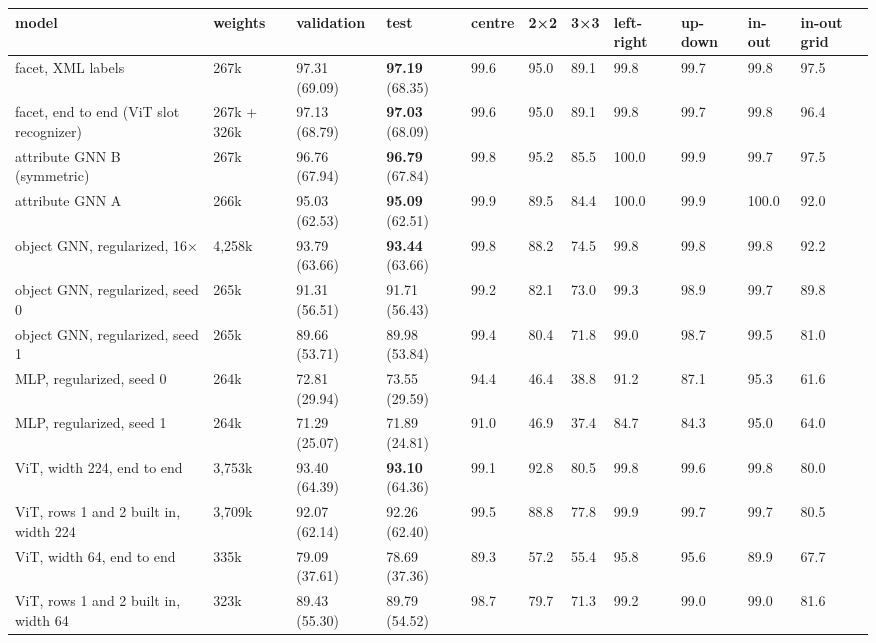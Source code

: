 \begin{center}\small
\begin{tabularx}{\linewidth}{@{}Yllllllllll@{}}
\toprule
model & weights & validation & \textbf{test} & centre & 2×2 & 3×3 & left-right & up-down & in-out & in-out grid \\
\midrule
facet, XML labels & 267k & 97.31 (69.09) & \textbf{97.19} (68.35) & 99.6 & 95.0 & 89.1 & 99.8 & 99.7 & 99.8 & 97.5 \\
facet, end to end (ViT slot recognizer) & 267k + 326k & 97.13 (68.79) & \textbf{97.03} (68.09) & 99.6 & 95.0 & 89.1 & 99.8 & 99.7 & 99.8 & 96.4 \\
attribute GNN B (symmetric) & 267k & 96.76 (67.94) & \textbf{96.79} (67.84) & 99.8 & 95.2 & 85.5 & 100.0 & 99.9 & 99.7 & 97.5 \\
attribute GNN A & 266k & 95.03 (62.53) & \textbf{95.09} (62.51) & 99.9 & 89.5 & 84.4 & 100.0 & 99.9 & 100.0 & 92.0 \\
object GNN, regularized, 16× & 4,258k & 93.79 (63.66) & \textbf{93.44} (63.66) & 99.8 & 88.2 & 74.5 & 99.8 & 99.8 & 99.8 & 92.2 \\
object GNN, regularized, seed 0 & 265k & 91.31 (56.51) & 91.71 (56.43) & 99.2 & 82.1 & 73.0 & 99.3 & 98.9 & 99.7 & 89.8 \\
object GNN, regularized, seed 1 & 265k & 89.66 (53.71) & 89.98 (53.84) & 99.4 & 80.4 & 71.8 & 99.0 & 98.7 & 99.5 & 81.0 \\
MLP, regularized, seed 0 & 264k & 72.81 (29.94) & 73.55 (29.59) & 94.4 & 46.4 & 38.8 & 91.2 & 87.1 & 95.3 & 61.6 \\
MLP, regularized, seed 1 & 264k & 71.29 (25.07) & 71.89 (24.81) & 91.0 & 46.9 & 37.4 & 84.7 & 84.3 & 95.0 & 64.0 \\
ViT, width 224, end to end & 3,753k & 93.40 (64.39) & \textbf{93.10} (64.36) & 99.1 & 92.8 & 80.5 & 99.8 & 99.6 & 99.8 & 80.0 \\
ViT, rows 1 and 2 built in, width 224 & 3,709k & 92.07 (62.14) & 92.26 (62.40) & 99.5 & 88.8 & 77.8 & 99.9 & 99.7 & 99.7 & 80.5 \\
ViT, width 64, end to end & 335k & 79.09 (37.61) & 78.69 (37.36) & 89.3 & 57.2 & 55.4 & 95.8 & 95.6 & 89.9 & 67.7 \\
ViT, rows 1 and 2 built in, width 64 & 323k & 89.43 (55.30) & 89.79 (54.52) & 98.7 & 79.7 & 71.3 & 99.2 & 99.0 & 99.0 & 81.6 \\
\bottomrule
\end{tabularx}
\end{center}

